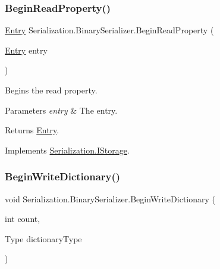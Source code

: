 \subsubsection{\texorpdfstring{Begin\+Read\+Property()}{BeginReadProperty()}}
{\footnotesize\ttfamily \hyperlink{class_serialization_1_1_entry}{Entry} Serialization.\+Binary\+Serializer.\+Begin\+Read\+Property (\begin{DoxyParamCaption}\item[{\hyperlink{class_serialization_1_1_entry}{Entry}}]{entry }\end{DoxyParamCaption})\hspace{0.3cm}{\ttfamily [inline]}}



Begins the read property. 


\begin{DoxyParams}{Parameters}
{\em entry} & The entry.\\
\hline
\end{DoxyParams}
\begin{DoxyReturn}{Returns}
\hyperlink{class_serialization_1_1_entry}{Entry}.
\end{DoxyReturn}


Implements \hyperlink{interface_serialization_1_1_i_storage_a4dab514d85acc8b9c97934025438cccf}{Serialization.\+I\+Storage}.

\mbox{\label{class_serialization_1_1_binary_serializer_afd9aec76b7b20ab88a9e3caca7470c8b}} 
\subsubsection{\texorpdfstring{Begin\+Write\+Dictionary()}{BeginWriteDictionary()}}
{\footnotesize\ttfamily void Serialization.\+Binary\+Serializer.\+Begin\+Write\+Dictionary (\begin{DoxyParamCaption}\item[{int}]{count,  }\item[{Type}]{dictionary\+Type }\end{DoxyParamCaption})\hspace{0.3cm}{\ttfamily [inline]}}



